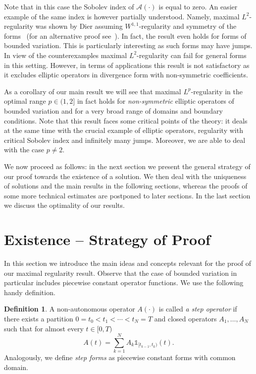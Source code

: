 \documentclass[reqno,a4paper,final]{amsart}
\numberwithin{equation}{section}
\theoremstyle{definition}
\newtheorem{definition}[lemma]{Definition}
\begin{document}
	Note that in this case the Sobolev index of $\mathcal{A}(\cdot)$ is equal to zero. An easier example of the same index is however partially understood. Namely, maximal $L^2$-regularity was shown by Dier assuming $W^{1,1}$-regularity and symmetry of the forms~\cite{Die15} (for an alternative proof see~\cite{MenHaf16}). In fact, the result even holds for forms of bounded variation. This is particularly interesting as such forms may have jumps. In view of the counterexamples maximal $L^2$-regularity can fail for general forms in this setting. However, in terms of applications this result is not satisfactory as it excludes elliptic operators in divergence form with non-symmetric coefficients.
	
	As a corollary of our main result we will see that maximal $L^p$-regularity in the optimal range $p \in (1,2]$ in fact holds for \emph{non-symmetric} elliptic operators of bounded variation and for a very broad range of domains and boundary conditions. Note that this result faces some critical points of the theory: it deals at the same time with the crucial example of elliptic operators, regularity with critical Sobolev index and infinitely many jumps. Moreover, we are able to deal with the case $p \neq 2$.
	
	We now proceed as follows: in the next section we present the general strategy of our proof towards the existence of a solution. We then deal with the uniqueness of solutions and the main results in the following sections, whereas the proofs of some more technical estimates are postponed to later sections. In the last section we discuss the optimality of our results.
	
\section{Existence -- Strategy of Proof}
	
	In this section we introduce the main ideas and concepts relevant for the proof of our maximal regularity result. Observe that the case of bounded variation in particular includes piecewise constant operator functions. We use the following handy definition.
	
	\begin{definition}
		A non-autonomous operator $A(\cdot)$ is called \emph{a step operator} if there exists a partition $0 = t_0 < t_1 < \cdots < t_N = T$ and closed operators $A_1, \ldots, A_N$ such that for almost every $t \in [0,T)$
			\begin{equation*}
				A(t) = \sum_{k=1}^N A_k \mathds{1}_{[t_{k-1}, t_k)}(t).
			\end{equation*}
		Analogously, we define \emph{step forms} as piecewise constant forms with common domain.
	\end{definition}
\end{document}
